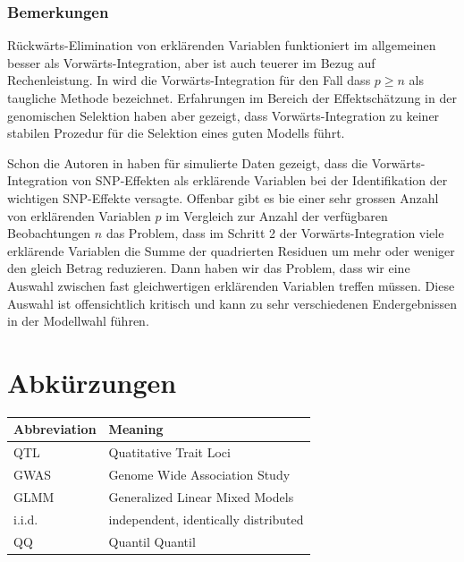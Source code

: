 \documentclass[]{book}
\begin{document}
\subsection{Bemerkungen}\label{bemerkungen}

Rückwärts-Elimination von erklärenden Variablen funktioniert im
allgemeinen besser als Vorwärts-Integration, aber ist auch teuerer im
Bezug auf Rechenleistung. In \citep{BM2014} wird die
Vorwärts-Integration für den Fall dass \(p \ge n\) als taugliche Methode
bezeichnet. Erfahrungen im Bereich der Effektschätzung in der
genomischen Selektion haben aber gezeigt, dass Vorwärts-Integration zu
keiner stabilen Prozedur für die Selektion eines guten Modells führt.

Schon die Autoren in \citep{MHG2001} haben für simulierte Daten gezeigt,
dass die Vorwärts-Integration von SNP-Effekten als erklärende Variablen
bei der Identifikation der wichtigen SNP-Effekte versagte. Offenbar gibt
es bie einer sehr grossen Anzahl von erklärenden Variablen \(p\) im
Vergleich zur Anzahl der verfügbaren Beobachtungen \(n\) das Problem,
dass im Schritt 2 der Vorwärts-Integration viele erklärende Variablen
die Summe der quadrierten Residuen um mehr oder weniger den gleich
Betrag reduzieren. Dann haben wir das Problem, dass wir eine Auswahl
zwischen fast gleichwertigen erklärenden Variablen treffen müssen. Diese
Auswahl ist offensichtlich kritisch und kann zu sehr verschiedenen
Endergebnissen in der Modellwahl führen.

\chapter*{Abkürzungen}\label{abkurzungen}

\begin{tabular}{l|l}
\hline
Abbreviation & Meaning\\
\hline
QTL & Quatitative Trait Loci\\
\hline
GWAS & Genome Wide Association Study\\
\hline
GLMM & Generalized Linear Mixed Models\\
\hline
i.i.d. & independent, identically distributed\\
\hline
QQ & Quantil Quantil\\
\hline
\end{tabular}


\end{document}
